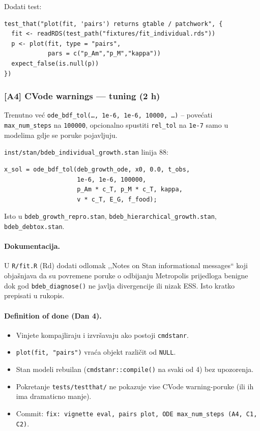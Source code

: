 \documentclass[11pt,a4paper]{article}
\newcommand{\file}[1]{\texttt{\small #1}}
\newcommand{\fn}[1]{\texttt{\small #1()}}
\newcommand{\code}[1]{\texttt{\small #1}}
\begin{document}
\noindent Dodati test:

\begin{lstlisting}
test_that("plot(fit, 'pairs') returns gtable / patchwork", {
  fit <- readRDS(test_path("fixtures/fit_individual.rds"))
  p <- plot(fit, type = "pairs",
            pars = c("p_Am","p_M","kappa"))
  expect_false(is.null(p))
})
\end{lstlisting}

\subsubsection*{[A4] CVode warnings --- tuning (2 h)}

Trenutno već \code{ode\_bdf\_tol(\dots, 1e-6, 1e-6, 10000, \dots)} --
povećati \code{max\_num\_steps} na \code{100000}, opcionalno
spustiti \code{rel\_tol} na \code{1e-7} samo u modelima gdje se
poruke pojavljuju.

\file{inst/stan/bdeb\_individual\_growth.stan} linija 88:

\begin{lstlisting}[style=Stanstyle]
x_sol = ode_bdf_tol(deb_growth_ode, x0, 0.0, t_obs,
                    1e-6, 1e-6, 100000,
                    p_Am * c_T, p_M * c_T, kappa,
                    v * c_T, E_G, f_food);
\end{lstlisting}

\noindent Isto u \code{bdeb\_growth\_repro.stan},
\code{bdeb\_hierarchical\_growth.stan}, \code{bdeb\_debtox.stan}.

\paragraph{Dokumentacija.}  U \file{R/fit.R} (Rd) dodati odlomak
,,Notes on Stan informational messages`` koji objašnjava da su
povremene poruke o odbijanju Metropolis prijedloga benigne dok
god \fn{bdeb\_diagnose} ne javlja divergencije ili nizak ESS.
Isto kratko prepisati u rukopis.

\paragraph{Definition of done (Dan 4).}
\begin{itemize}[leftmargin=1.4em,nosep]
  \item Vinjete kompajliraju i izvršavaju ako postoji \code{cmdstanr}.
  \item \code{plot(fit, "pairs")} vraća objekt različit od
    \code{NULL}.
  \item Stan modeli rebuilan (\code{cmdstanr::compile()} na svaki
    od 4) bez upozorenja.
  \item Pokretanje \code{tests/testthat/} ne pokazuje vise CVode
    warning-poruke (ili ih ima dramaticno manje).
  \item Commit: \code{fix: vignette eval, pairs plot, ODE
    max\_num\_steps (A4, C1, C2)}.
\end{itemize}
\end{document}
